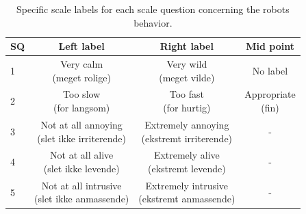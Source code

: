 %
\begin{table}[H]
	\centering
	\begin{tabular}{l|c|c|c}
		SQ     & Left label & Right label & Mid point \\\hline
		1   & \makecell{Very calm \\(meget rolige)} & \makecell{Very wild \\(meget vilde)} & No label          \\\hline
		2   & \makecell{Too slow \\(for langsom)} & \makecell{Too fast \\(for hurtig)} & \makecell{Appropriate \\(fin)}         \\\hline
		3   & \makecell{Not at all annoying \\(slet ikke irriterende)} & \makecell{Extremely annoying \\(ekstremt irriterende)} & -         \\\hline
	 	4   & \makecell{Not at all alive \\(slet ikke levende)} & \makecell{Extremely alive \\(ekstremt levende)} & -         \\\hline
		5   & \makecell{Not at all intrusive \\(slet ikke anmassende)} & \makecell{Extremely intrusive \\(ekstremt anmassende)} & -            
	\end{tabular}
	\caption{Specific scale labels for each scale question concerning the robots behavior.}
	\label{tab:BehaviorScale}         
\end{table}
\noindent
%


